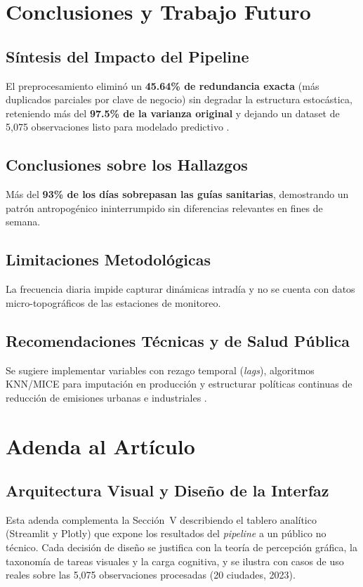 \documentclass[journal,twocolumn,spanish]{IEEEtran}
\begin{document}
\section{Conclusiones y Trabajo Futuro}

\subsection{Síntesis del Impacto del Pipeline}
El preprocesamiento eliminó un \textbf{45.64\% de redundancia exacta} (más duplicados parciales por clave de negocio) sin degradar la estructura estocástica, reteniendo más del \textbf{97.5\% de la varianza original} y dejando un dataset de 5,075 observaciones listo para modelado predictivo \cite{Pedregosa2011}.

\subsection{Conclusiones sobre los Hallazgos}
Más del \textbf{93\% de los días sobrepasan las guías sanitarias}, demostrando un patrón antropogénico ininterrumpido sin diferencias relevantes en fines de semana.

\subsection{Limitaciones Metodológicas}
La frecuencia diaria impide capturar dinámicas intradía y no se cuenta con datos micro-topográficos de las estaciones de monitoreo.

\subsection{Recomendaciones Técnicas y de Salud Pública}
Se sugiere implementar variables con rezago temporal (\emph{lags}), algoritmos KNN/MICE para imputación en producción y estructurar políticas continuas de reducción de emisiones urbanas e industriales \cite{Rivas2022}.

\section*{Adenda al Artículo}

\subsection*{Arquitectura Visual y Diseño de la Interfaz}
Esta adenda complementa la Sección~V describiendo el tablero analítico (Streamlit y Plotly) que expone los resultados del \emph{pipeline} a un público no técnico. Cada decisión de diseño se justifica con la teoría de percepción gráfica, la taxonomía de tareas visuales y la carga cognitiva, y se ilustra con casos de uso reales sobre las 5,075 observaciones procesadas (20 ciudades, 2023).
\end{document}
